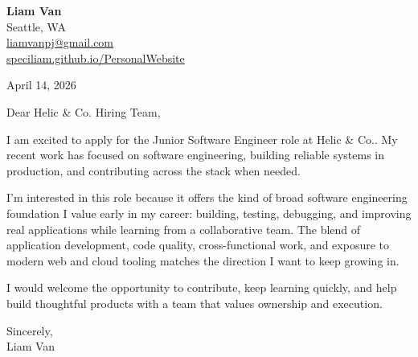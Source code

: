 \documentclass[letterpaper,11pt]{article}
\begin{document}
\begin{flushleft}
\textbf{\Large Liam Van} \\
Seattle, WA \\
\href{mailto:liamvanpj@gmail.com}{liamvanpj@gmail.com} \\
\href{https://speciliam.github.io/PersonalWebsite}{speciliam.github.io/PersonalWebsite}
\end{flushleft}

April 14, 2026

\noindent Dear Helic \& Co. Hiring Team,

\noindent I am excited to apply for the Junior Software Engineer role at Helic \& Co.. My recent work has focused on software engineering, building reliable systems in production, and contributing across the stack when needed.

\noindent I'm interested in this role because it offers the kind of broad software engineering foundation I value early in my career: building, testing, debugging, and improving real applications while learning from a collaborative team. The blend of application development, code quality, cross-functional work, and exposure to modern web and cloud tooling matches the direction I want to keep growing in.

\noindent I would welcome the opportunity to contribute, keep learning quickly, and help build thoughtful products with a team that values ownership and execution.

\noindent Sincerely, \\
Liam Van
\end{document}
